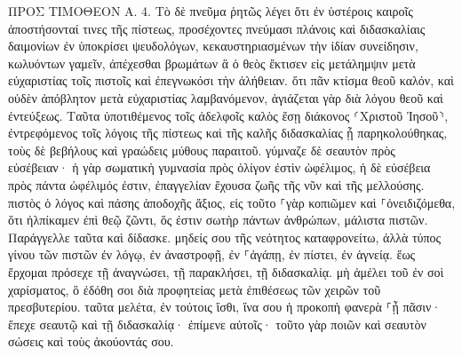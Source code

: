 \documentclass[twoside, 9pt]{extreport}
\begin{document}
ΠΡΟΣ ΤΙΜΟΘΕΟΝ Α.
4.
Τὸ δὲ πνεῦμα ῥητῶς λέγει ὅτι ἐν ὑστέροις καιροῖς ἀποστήσονταί τινες τῆς πίστεως, προσέχοντες πνεύμασι πλάνοις καὶ διδασκαλίαις δαιμονίων 
ἐν ὑποκρίσει ψευδολόγων, κεκαυστηριασμένων τὴν ἰδίαν συνείδησιν, 
κωλυόντων γαμεῖν, ἀπέχεσθαι βρωμάτων ἃ ὁ θεὸς ἔκτισεν εἰς μετάλημψιν μετὰ εὐχαριστίας τοῖς πιστοῖς καὶ ἐπεγνωκόσι τὴν ἀλήθειαν. 
ὅτι πᾶν κτίσμα θεοῦ καλόν, καὶ οὐδὲν ἀπόβλητον μετὰ εὐχαριστίας λαμβανόμενον, 
ἁγιάζεται γὰρ διὰ λόγου θεοῦ καὶ ἐντεύξεως. 
Ταῦτα ὑποτιθέμενος τοῖς ἀδελφοῖς καλὸς ἔσῃ διάκονος ⸂Χριστοῦ Ἰησοῦ⸃, ἐντρεφόμενος τοῖς λόγοις τῆς πίστεως καὶ τῆς καλῆς διδασκαλίας ᾗ παρηκολούθηκας, 
τοὺς δὲ βεβήλους καὶ γραώδεις μύθους παραιτοῦ. γύμναζε δὲ σεαυτὸν πρὸς εὐσέβειαν· 
ἡ γὰρ σωματικὴ γυμνασία πρὸς ὀλίγον ἐστὶν ὠφέλιμος, ἡ δὲ εὐσέβεια πρὸς πάντα ὠφέλιμός ἐστιν, ἐπαγγελίαν ἔχουσα ζωῆς τῆς νῦν καὶ τῆς μελλούσης. 
πιστὸς ὁ λόγος καὶ πάσης ἀποδοχῆς ἄξιος, 
εἰς τοῦτο ⸀γὰρ κοπιῶμεν καὶ ⸀ὀνειδιζόμεθα, ὅτι ἠλπίκαμεν ἐπὶ θεῷ ζῶντι, ὅς ἐστιν σωτὴρ πάντων ἀνθρώπων, μάλιστα πιστῶν. 
Παράγγελλε ταῦτα καὶ δίδασκε. 
μηδείς σου τῆς νεότητος καταφρονείτω, ἀλλὰ τύπος γίνου τῶν πιστῶν ἐν λόγῳ, ἐν ἀναστροφῇ, ἐν ⸀ἀγάπῃ, ἐν πίστει, ἐν ἁγνείᾳ. 
ἕως ἔρχομαι πρόσεχε τῇ ἀναγνώσει, τῇ παρακλήσει, τῇ διδασκαλίᾳ. 
μὴ ἀμέλει τοῦ ἐν σοὶ χαρίσματος, ὃ ἐδόθη σοι διὰ προφητείας μετὰ ἐπιθέσεως τῶν χειρῶν τοῦ πρεσβυτερίου. 
ταῦτα μελέτα, ἐν τούτοις ἴσθι, ἵνα σου ἡ προκοπὴ φανερὰ ⸀ᾖ πᾶσιν· 
ἔπεχε σεαυτῷ καὶ τῇ διδασκαλίᾳ· ἐπίμενε αὐτοῖς· τοῦτο γὰρ ποιῶν καὶ σεαυτὸν σώσεις καὶ τοὺς ἀκούοντάς σου. 
\end{document}
